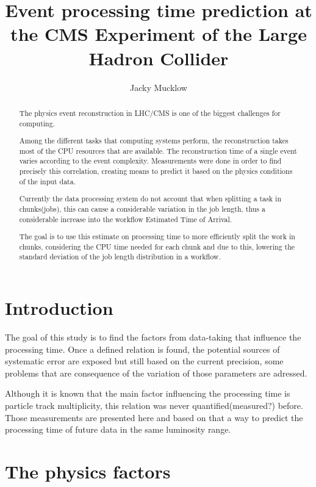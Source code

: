 \documentclass[a4paper]{jpconf}
\begin{document}
\title{Event processing time prediction at the CMS Experiment of the Large Hadron Collider}

\author{Jacky Mucklow}

\address{Production Editor, \jpcs, \iopp, Dirac House, Temple Back, Bristol BS1~6BE, UK}


\begin{abstract}
The physics event reconstruction in LHC/CMS is one of the biggest challenges for computing.

Among the different tasks that computing systems perform, the reconstruction takes most of the CPU resources that are available. The reconstruction time of a single event varies according to the event complexity. Measurements were done in order to find precisely this correlation, creating means to predict it based on the physics conditions of the input data.

Currently the data processing system do not account that when splitting a task in chunks(jobs), this can cause a considerable variation in the job length, thus a considerable increase into the workflow Estimated Time of Arrival.

The goal is to use this estimate on processing time to more efficiently split the work in chunks, considering the CPU time needed for each chunk and due to this, lowering the standard deviation of the job length distribution in a workflow.
\end{abstract}

\section{Introduction}
The goal of this study is to find the factors from data-taking that influence the processing time. Once a defined relation is found, the potential sources of systematic error are exposed but still based on the current precision, some problems that are consequence of the variation of those parameters are adressed.

Although it is known that the main factor influencing the processing time is particle track multiplicity, this relation was never quantified(measured?) before. Those measurements are presented here and based on that a way to predict the processing time of future data in the same luminosity range.

\section{The physics factors}
\end{document}
